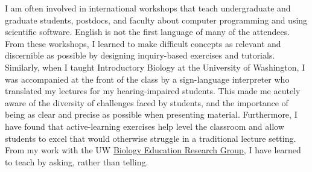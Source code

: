 I am often involved in international workshops that teach undergraduate and
graduate students, postdocs, and faculty about computer programming and
using scientific software.
English is not the first language of many of the attendees.
From these workshops, I learned to make difficult concepts as relevant and
discernible as possible by designing
inquiry-based exercises and tutorials.
Similarly, when I taught Introductory Biology at the University of
Washington, I was accompanied at the front of the class by a sign-language
interpreter who translated my lectures for my hearing-impaired students.
This made me acutely aware of the diversity of challenges faced by
students, and the importance of being as clear and precise as possible when
presenting material.
Furthermore, I have found that active-learning exercises help level the
classroom and allow students to excel that would otherwise struggle in a
traditional lecture setting.
From my work with the UW
\href{https://sites.google.com/site/uwbioedresgroup/home}{Biology Education
    Research Group}, I have learned to teach by asking, rather than telling.


